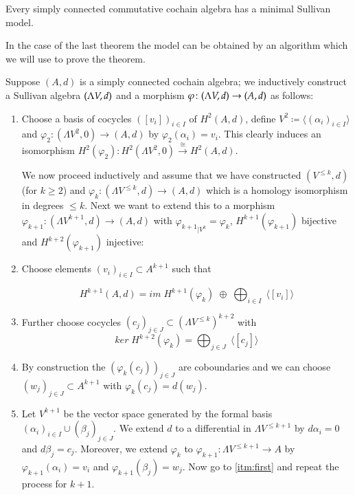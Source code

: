 \begin{Theorem}
 \label{thm:MinimalSullivanModelsExistForSimplyConnected}
 Every simply connected commutative cochain algebra has a minimal Sullivan model.
\end{Theorem}

In the case of the last theorem the model can be obtained by an algorithm which we will use to prove the theorem.

\begin{Algorithm}
\label{alg:ConstructionOfMinimalSullivanAlgebra}
 Suppose $(A,d)$ is a simply connected cochain algebra; we inductively construct a Sullivan algebra $(\Lambda V,d)$ and a morphism
 $\varphi \colon (\Lambda V,d) \to (A,d)$ as follows:
 
 \begin{enumerate}
  \item \label{itm:FirstAlgorithmStep} Choose a basis of cocycles $([v_i])_{i \in I}$ of $H^2(A,d)$, 
  define $V^2 \coloneqq \langle (\alpha_i)_{i \in I} \rangle$ and
  $\varphi_2 \colon (\Lambda V^2,0) \to (A,d)$ by $\varphi_2(\alpha_i) = v_i$. This clearly induces an isomorphism 
  $H^2(\varphi_2) \colon H^2(\Lambda V^2, 0) \overset{\cong}{\to} H^2(A,d)$.
   
   We now proceed inductively and assume that we have constructed $(V^{\leq k}, d)$ (for $k \geq 2$) and
   ${\varphi_k \colon (\Lambda V^{\leq k}, d) \to (A,d)}$ which is a homology isomorphism in degrees $\leq k$.
   Next we want to extend this to a morphism $\varphi_{k+1} \colon (\Lambda V^{k+1}, d) \to (A,d)$ with 
   ${\varphi_{k+1}}_{|V^k} = \varphi_k$, $H^{k+1}(\varphi_{k+1})$ bijective and $H^{k + 2}(\varphi_{k+1})$ injective:
   
   \item \label{itm:first} Choose elements $(v_i)_{i \in I} \subset A^{k+1}$ such that
   
   $$H^{k+1}(A,d) = im \; H^{k+1}(\varphi_k) \; \oplus \; \bigoplus_{i \in I} \; \langle [v_i] \rangle $$
   
   \item \label{itm:third} Further choose cocycles $(c_j)_{j \in J} \subset (\Lambda V^{\leq k})^{k+2}$ with
   $$ ker \; H^{k+2}(\varphi_k) = \bigoplus_{j \in J} \; \langle [c_j] \rangle$$
   
   \item By construction the $(\varphi_k(c_j))_{j \in J}$ are coboundaries and we can choose 
   $(w_j)_{j \in J} \subset A^{k+1}$ with $\varphi_k (c_j) = d(w_j)$.
   \item \label{itm:second} Let 
   $V^{k+1}$ be the vector space generated by the formal basis $(\alpha_i)_{i \in I} \cup (\beta_j)_{j \in J}$. We extend $d$
   to a differential in $\Lambda V^{\leq k+1}$ by $d \alpha_i = 0$ and $d \beta_j = c_j$. Moreover, we extend $\varphi_k$
   to $\varphi_{k+1} \colon \Lambda V^{ \leq k+1} \to A$ by $\varphi_{k+1} (\alpha_i) = v_i$ and 
   $\varphi_{k+1} (\beta_j) = w_j$. Now go to \ref{itm:first} and repeat the process for $k+1$.
 \end{enumerate}

\end{Algorithm}
